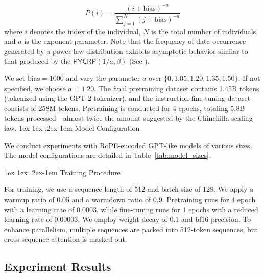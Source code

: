 \documentclass[11pt]{article}
\makeatletter
\theoremstyle{plain}
\theoremstyle{definition}
\renewcommand{\paragraph}{%
  \@startsection{paragraph}{4}%
  {\z@}{1ex \@plus 1ex \@minus .2ex}{-1em}%
  {\normalfont\normalsize\bfseries}%
}
\newcommand{\PYCRP}{\mathsf{PYCRP}}
\makeatother
\begin{document}
\begin{equation}
    P(i) = \frac{(i + \text{bias})^{-a}}{\sum_{j=1}^{N} (j + \text{bias})^{-a}}
\label{eq:powerlaw}
\end{equation}
where $i$ denotes the index of the individual, $N$ is the total number of individuals, and $a$ is the exponent parameter. Note that the frequency of data occurrence generated by a power-law distribution exhibits asymptotic behavior similar to that produced by the 
 $\PYCRP(1/a,\beta)$ (See ).


We set $\text{bias} = 1000$ and vary the parameter $a$ over $\{0, 1.05, 1.20, 1.35, 1.50\}$. If not specified, we choose $a=1.20$. The final pretraining dataset contains 1.45B tokens (tokenized using the GPT-2 tokenizer), and the instruction fine-tuning dataset consists of 258M tokens. Pretraining is conducted for 4 epochs, totaling 5.8B tokens processed—almost twice the amount suggested by the Chinchilla scaling law.
\paragraph{Model Configuration}

We conduct experiments with RoPE-encoded GPT-like models \cite{modded_nanogpt_2024} of various sizes. The model configurations are detailed in Table~\ref{tab:model_sizes}.

\paragraph{Training Procedure}

For training, we use a sequence length of 512 and batch size of 128. We apply a warmup ratio of 0.05 and a warmdown ratio of 0.9. Pretraining runs for 4 epoch with a learning rate of 0.0003, while fine-tuning runs for 1 epochs with a reduced learning rate of 0.00003. We employ weight decay of 0.1 and bf16 precision. To enhance parallelism, multiple sequences are packed into 512-token sequences, but cross-sequence attention is masked out.




\subsection{Experiment Results}
\label{app:additionalexp}
\end{document}
